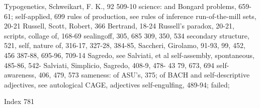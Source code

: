 Typogenetics,                             Schweikart, F. K., 92
509-10                                    science: and Bongard problems, 659-61;
                                          self-applied, 699
rules of production, see rules of inference
run-of-the-mill sets, 20-21 Russell,      Scott, Robert, 366
Bertrand, 18-24 Russell's paradox, 20-21, scripts, collage of, 168-69 sealingoff, 305,
685                                       309, 350, 534 secondary structure, 521,
                                          self, nature of, 316-17, 327-28, 384-85,
Saccheri, Girolamo, 91-93, 99, 452, 456   387-88, 695-96, 709-14
Sagredo, see Salviati, et al              self-assembly, spontaneous, 485-86, 542-
Salviati, Simplicio, Sagredo, 408-9, 478- 43
79, 673, 694                              self-awareness, 406, 479, 573
sameness: of ASU's, 375; of BACH and self-descriptive adjectives, see autological
CAGE,                                     adjectives self-engulfing, 489-94; failed;



Index                                                                             781

